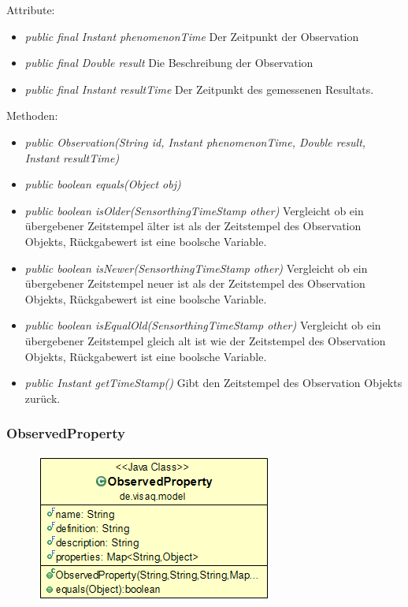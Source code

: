 Attribute:
\begin{itemize} 
	\item \emph{public final Instant phenomenonTime} Der Zeitpunkt der Observation
	\item \emph{public final Double result} Die Beschreibung der Observation
	\item \emph{public final Instant resultTime} Der Zeitpunkt des gemessenen Resultats.
\end{itemize}
Methoden:
\begin{itemize} 
	\item \emph{public Observation(String id, Instant phenomenonTime, Double result, Instant resultTime)} 
	\item \emph{public boolean equals(Object obj)} 
	\item \emph{public boolean isOlder(SensorthingTimeStamp other)} Vergleicht ob ein übergebener Zeitstempel älter ist als der Zeitstempel des Observation Objekts, Rückgabewert ist eine boolsche Variable.
	\item \emph{public boolean isNewer(SensorthingTimeStamp other)} Vergleicht ob ein übergebener Zeitstempel neuer ist als der Zeitstempel des Observation Objekts, Rückgabewert ist eine boolsche Variable.
	\item \emph{public boolean isEqualOld(SensorthingTimeStamp other)} Vergleicht ob ein übergebener Zeitstempel gleich alt ist wie der Zeitstempel des Observation Objekts, Rückgabewert ist eine boolsche Variable.
	\item \emph{public Instant getTimeStamp()} Gibt den Zeitstempel des Observation Objekts zurück.
\end{itemize}


\subsubsection {ObservedProperty}
\begin{minipage}{0.3\textwidth}
	\begin{figure}[H]
		\includegraphics[scale = 0.5
		]{media/frontend/model/ObservedProperty_Class.png}
	\end{figure}
\end{minipage} \hfill
\begin{minipage}{0.6\textwidth}
\end{minipage}

